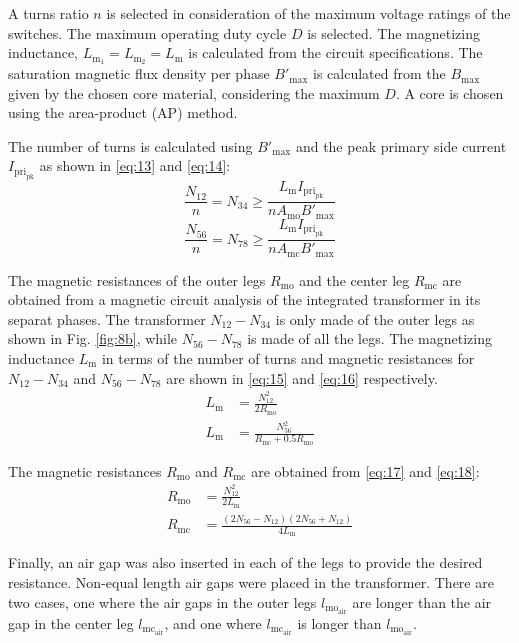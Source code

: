 \documentclass[lettersize,journal]{IEEEtran}
\begin{document}
A turns ratio $n$ is selected in consideration of the maximum voltage ratings of the switches. The maximum operating duty cycle $D$ is selected. The magnetizing inductance, $L_{\mathrm{m}_1}=L_{\mathrm{m}_2}=L_{\mathrm{m}}$ is calculated from the circuit specifications. The saturation magnetic flux density per phase $B'_{\mathrm{max}}$ is calculated from the $B_{\mathrm{max}}$ given by the chosen core material, considering the maximum $D$. A core is chosen using the area-product (AP) method. 

The number of turns is calculated using $B'_{\mathrm{max}}$ and the peak primary side current $I_{\mathrm{pri}_{\mathrm{pk}}}$ as shown in \eqref{eq:13} and \eqref{eq:14}:
\begin{equation}
\label{eq:13}
\frac{N_{12}}{n} = N_{34} \ge \frac{L_{\mathrm{m}} I_{\mathrm{pri}_{\mathrm{pk}}}}{n A_{\mathrm{mo}} B'_{\mathrm{max}}}
\end{equation}
\begin{equation}
\label{eq:14}
\frac{N_{56}}{n} = N_{78} \ge \frac{L_{\mathrm{m}} I_{\mathrm{pri}_{\mathrm{pk}}}}{n A_{\mathrm{mc}} B'_{\mathrm{max}}}
\end{equation}

The magnetic resistances of the outer legs $R_{\mathrm{mo}}$ and the center leg $R_{\mathrm{mc}}$ are obtained from a magnetic circuit analysis of the integrated transformer in its separat phases. The transformer $N_{12}-N_{34}$ is only made of the outer legs as shown in Fig. \ref{fig:8b}, while $N_{56}-N_{78}$ is made of all the legs. The magnetizing inductance $L_{\mathrm{m}}$ in terms of the number of turns and magnetic resistances for $N_{12}-N_{34}$ and $N_{56}-N_{78}$ are shown in \eqref{eq:15} and \eqref{eq:16} respectively.
\begin{align}
L_{\mathrm{m}} &= \frac{N_{12}^2}{2 R_{\mathrm{mo}}} \label{eq:15}\\
L_{\mathrm{m}} &= \frac{N_{56}^2}{R_{\mathrm{mc}} + 0.5 R_{\mathrm{mo}}} \label{eq:16}
\end{align}

The magnetic resistances $R_{\mathrm{mo}}$ and $R_{\mathrm{mc}}$ are obtained from \eqref{eq:17} and \eqref{eq:18}:
\begin{align}
R_{\mathrm{mo}} &= \frac{N_{12}^2}{2 L_{\mathrm{m}}} \label{eq:17}\\
R_{\mathrm{mc}} &= \frac{(2 N_{56} - N_{12})(2 N_{56} + N_{12})}{4 L_{\mathrm{m}}} \label{eq:18}
\end{align}

Finally, an air gap was also inserted in each of the legs to provide the desired resistance. Non-equal length air gaps were placed in the transformer. There are two cases, one where the air gaps in the outer legs $l_{\mathrm{mo}_{\mathrm{air}}}$ are longer than the air gap in the center leg $l_{\mathrm{mc}_{\mathrm{air}}}$, and one where $l_{\mathrm{mc}_{\mathrm{air}}}$ is longer than $l_{\mathrm{mo}_{\mathrm{air}}}$.
\end{document}
